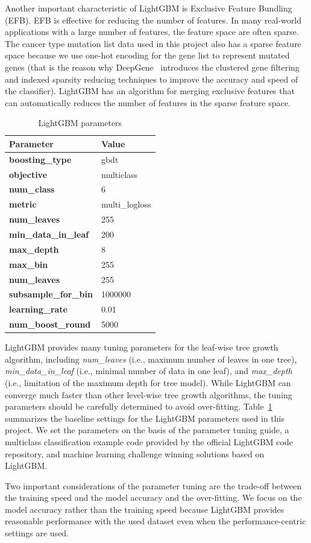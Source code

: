 Another important characteristic of LightGBM is Exclusive Feature Bundling (EFB). EFB is effective for reducing the number of features. In many real-world applications with a large number of features, the feature space are often sparse. The cancer type mutation list data used in this project also has a sparse feature space because we use one-hot encoding for the gene list to represent mutated genes (that is the reason why DeepGene~\cite{yuan2016deepgene} introduces the clustered gene filtering and indexed sparsity reducing techniques to improve the accuracy and speed of the classifier). LightGBM has an algorithm for merging exclusive features that can automatically reduces the number of features in the sparse feature space. 

\begin{table}
\caption{LightGBM parameters}
\centering
\begin{tabular}{|l||l|}
\hline
{\bf Parameter} & {\bf Value}\\
\hline
\hline
{\bf boosting\_type} & gbdt \\
\hline
{\bf objective} & multiclass \\
\hline
{\bf num\_class} & 6 \\
\hline
{\bf metric} & multi\_logloss \\
\hline
{\bf num\_leaves} & 255 \\
\hline
{\bf min\_data\_in\_leaf} & 200 \\
\hline
{\bf max\_depth} & 8 \\
\hline
{\bf max\_bin} & 255 \\
\hline
{\bf num\_leaves} & 255 \\
\hline
{\bf subsample\_for\_bin} & 1000000 \\
\hline
{\bf learning\_rate} & 0.01 \\
\hline
{\bf num\_boost\_round} & 5000 \\
\hline
\end{tabular}
\label{tab:lightgbm_parameters}
\end{table}

LightGBM provides many tuning parameters for the leaf-wise tree growth algorithm, including \textit{num\_leaves} (i.e., maximum number of leaves in one tree), \textit{min\_data\_in\_leaf} (i.e., minimal number of data in one leaf), and \textit{max\_depth} (i.e., limitation of the maximum depth for tree model). While LightGBM can converge much faster than other level-wise tree growth algorithms, the tuning parameters should be carefully determined to avoid over-fitting. Table~\ref{tab:lightgbm_parameters} summarizes the baseline settings for the LightGBM parameters used in this project. We set the parameters on the basis of the parameter tuning guide, a multiclass classification example code provided by the official LightGBM code repository, and machine learning challenge winning solutions based on LightGBM.

Two important considerations of the parameter tuning are the trade-off between the training speed and the model accuracy and the over-fitting. We focus on the model accuracy rather than the training speed because LightGBM provides reasonable performance with the used dataset even when the performance-centric settings are used.
